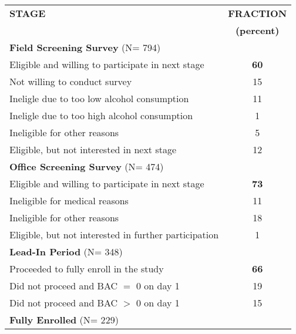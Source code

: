 \begin{tabular}{l c} \toprule \textbf{STAGE} & \textbf{FRACTION} \\ & \textbf{(percent)} \\ \midrule \textbf{Field Screening Survey} (N=     794) & \\ \midrule {Eligible and willing to participate in next stage} & \textbf{     60 } \\Not willing to conduct survey &      15 \\Ineligle due to too low alcohol consumption &      11 \\Ineligle due to too high alcohol consumption  &       1 \\Ineligible for other reasons &       5 \\Eligible, but not interested in next stage &      12 \\ \midrule \textbf{Office Screening Survey} (N=     474) \\ \midrule Eligible and willing to participate in next stage & \textbf{     73 } \\Ineligible for medical reasons &      11 \\Ineligible for other reasons &      18 \\Eligible, but not interested in further participation &       1 \\ \midrule  \textbf{Lead-In Period} (N=     348) \\ \midrule  Proceeded to fully enroll in the study & \textbf{     66 } \\ Did not proceed and BAC $=$ 0 on day 1 &      19  \\ Did not proceed and BAC $>$ 0 on day 1 &      15  \\ \midrule  \textbf{Fully Enrolled} (N=     229)  \\ \bottomrule  \end{tabular} 